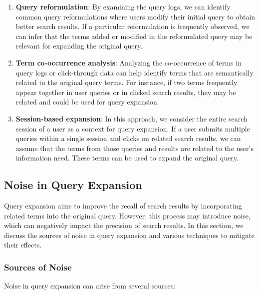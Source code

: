 \documentclass[12pt]{article}
\begin{document}
\begin{enumerate}
    \item \textbf{Query reformulation}: By examining the query logs, we can identify common query reformulations where users modify their initial query to obtain better search results. If a particular reformulation is frequently observed, we can infer that the terms added or modified in the reformulated query may be relevant for expanding the original query.
    
    \item \textbf{Term co-occurrence analysis}: Analyzing the co-occurrence of terms in query logs or click-through data can help identify terms that are semantically related to the original query terms. For instance, if two terms frequently appear together in user queries or in clicked search results, they may be related and could be used for query expansion. 
    
    \item \textbf{Session-based expansion}: In this approach, we consider the entire search session of a user as a context for query expansion. If a user submits multiple queries within a single session and clicks on related search results, we can assume that the terms from those queries and results are related to the user's information need. These terms can be used to expand the original query.
\end{enumerate}

\subsection{Noise in Query Expansion}

Query expansion aims to improve the recall of search results by incorporating related terms into the original query. However, this process may introduce noise, which can negatively impact the precision of search results. In this section, we discuss the sources of noise in query expansion and various techniques to mitigate their effects.

\subsubsection{Sources of Noise}
\label{sec:sources_noise}

Noise in query expansion can arise from several sources:
\end{document}
